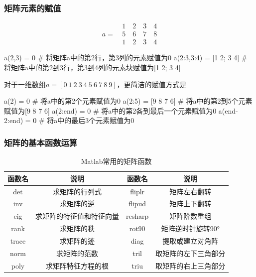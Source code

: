 \documentclass[dvipsnames, svgnames, x11names]{beamer}
\begin{document}
\begin{frame}[fragile]
    \frametitle{矩阵元素的赋值}
    \vspace{-1em}
    \[
        \begin{aligned}
                 &1\quad 2\quad 3\quad 4 \\
            a =\ &5\quad 6\quad 7\quad 8 \\
                  &1\quad 2\quad 3\quad 4
        \end{aligned}
    \]
\begin{codeblock}{}
a(2,3) = 0 # 将矩阵a中的第2行，第3列的元素赋值为0
a(2:3,3:4) = [1 2; 3 4] # 将矩阵a中的第2到3行，第3到4列的元素块赋值为[1 2; 3 4]
\end{codeblock}
对于一维数组$a = [0\ 1\ 2\ 3\ 4\ 5\ 6\ 7\ 8\ 9]$，更简洁的赋值方式是
\begin{codeblock}{}
a(2) = 0 # 将a中的第2个元素赋值为0
a(2:5) = [9 8 7 6] # 将a中的第2到5个元素赋值为[9 8 7 6]
a(2:end) = 0 # 将a中的第2各到最后一个元素赋值为0
a(end-2:end) = 0 # 将a中的最后3个元素赋值为0
\end{codeblock}
\vspace{-2pt}
\end{frame}


\begin{frame}
    \frametitle{矩阵的基本函数运算}
    \begin{table}
        \centering
        \caption{Matlab常用的矩阵函数}
        \begin{tabular}{c|c||c|c}
            \bottomrule
            函数名 & 说明 & 函数名 & 说明 \\ \hline
            det & 求矩阵的行列式 & fliplr & 矩阵左右翻转 \\ \hline
            inv & 求矩阵的逆 & flipud & 矩阵上下翻转 \\ \hline
            eig & 求矩阵的特征值和特征向量 & resharp & 矩阵阶数重组 \\ \hline
            rank & 求矩阵的秩 & rot90 & 矩阵逆时针旋转90° \\ \hline
            trace & 求矩阵的迹 & diag & 提取或建立对角阵 \\ \hline
            norm & 求矩阵的范数 & tril & 取矩阵的左下三角部分 \\ \hline
            poly & 求矩阵特征方程的根 & triu & 取矩阵的右上三角部分 \\ \toprule
        \end{tabular}
    \end{table}
\end{frame}
\end{document}
